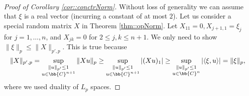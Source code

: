 \documentclass[12pt]{article}%
\theoremstyle{plain}%
\theoremstyle{remark}
\begin{document}
~

\begin{proof}[Proof of Corollary \ref{cor::conctrNorm}]
Without loss of generality we can assume that $\xi$ is a real vector (incurring a constant of at most $2$). Let us consider a special random matrix $X$ in Theorem \ref{thm::opNorm}. Let $X_{11} = 0, X_{j+1,1} = \xi_j$ for $j=1,\ldots,n$, and $X_{jk} = 0 $ for $2 \le j,k \le n+1$. We only need to show $\| \xi \|_p \le \| X \|_{p',p}$. This is true because
\begin{equation*}
\| X \|_{p',p} = \sup_{\substack{\| u \|_{p'} \le 1 \\ u \in \bb{C}^{n+1}}} \| X u \|_p \ge \sup_{\substack{\| u \|_{p'} \le 1 \\ u \in \bb{C}^{n+1}}} | (X u)_1 |  \ge \sup_{\substack{\| u \|_{p'} \le 1 \\ u \in \bb{C}^{n}}} | \langle \xi, u \rangle | = \| \xi \|_p,
\end{equation*}
where we used duality of $L_p$ spaces.
\end{proof}

~
\end{document}
